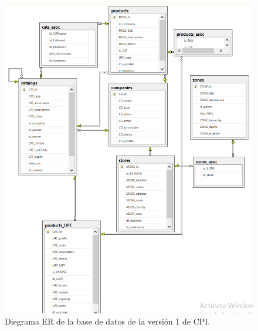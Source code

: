     
       \begin{figure}[H]
       \begin{center}
       \includegraphics[width=\textwidth]{er_viejo.png}
       \caption{Diegrama ER de la base de datos de la versión 1 de CPI.}
       \label{fig:er_viejo}
       \end{center}
       \end{figure}

